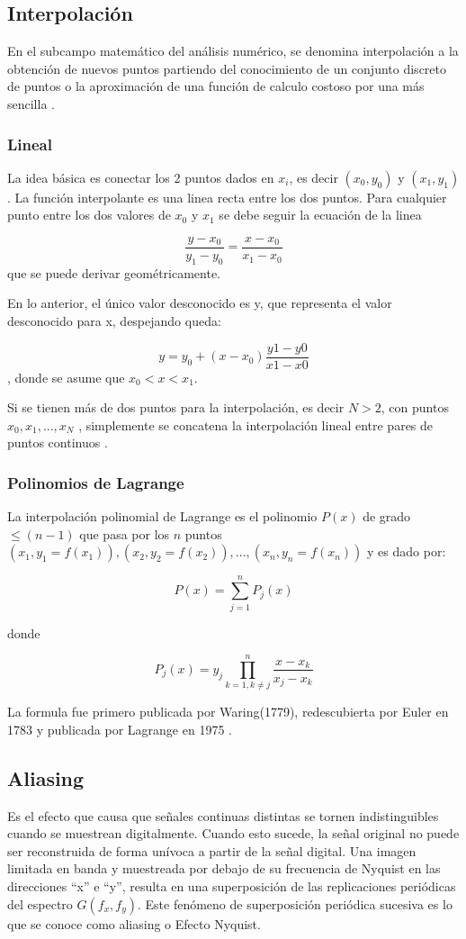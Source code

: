 \documentclass[comsoc, journal]{IEEEtran}
\begin{document}
\subsection{Interpolación}
En el subcampo matemático del análisis numérico, se denomina interpolación a la obtención de nuevos puntos partiendo del conocimiento de un conjunto discreto de puntos o la aproximación de una función de calculo costoso por una más sencilla \cite{crochiere}.

\subsubsection{Lineal}

La idea básica es conectar los 2 puntos dados en $x_i$, es decir $(x_0, y_0)$ y $(x_1, y_1)$. La función interpolante es una linea recta entre los dos puntos. Para cualquier punto entre los dos valores de $x_0$ y $x_1$ se debe seguir la ecuación de la linea

$$\frac{y - x_0}{y_1 - y_0} = \frac{x - x_0}{x_1 - x_0}$$
que se puede derivar geométricamente.

En lo anterior, el único valor desconocido es y, que representa el valor desconocido para x, despejando queda:

$$y = y_0 + (x - x_0) \frac{y1 - y0}{x1 - x0}$$
, 
donde se asume que $x_0 < x < x_1$.

Si se tienen más de dos puntos para la interpolación, es decir $N > 2$, con
puntos $x_0, x_1,..., x_N$ , simplemente se concatena la interpolación lineal entre pares de puntos continuos \cite{interp}.

\subsubsection{Polinomios de Lagrange}

La interpolación polinomial de Lagrange es el polinomio $P(x)$ de grado $\leq (n-1)$ que pasa por los $n$ puntos $(x_1, y_1 = f(x_1)), (x_2, y_2 = f(x_2)), ... , (x_n, y_n = f(x_n))$ y es dado por:

$$P(x) =\sum_{j=1}^{n} P_j(x)$$

donde

$$P_j(x) = y_j \prod_{k=1 , k \neq j}^{n} \frac{x-x_k}{x_j - x_k}$$

La formula fue primero publicada por Waring(1779), redescubierta por Euler en 1783 y publicada por Lagrange en 1975 \cite{lagr}.


\subsection{Aliasing}
Es el efecto que causa que señales continuas distintas se tornen indistinguibles cuando se muestrean digitalmente. Cuando esto sucede, la señal original no puede ser reconstruida de forma unívoca a partir de la señal digital. Una imagen limitada en banda y muestreada por debajo de su frecuencia de Nyquist en las direcciones ``x'' e ``y'', resulta en una superposición de las replicaciones periódicas del espectro $G(f_x, f_y)$. Este fenómeno de superposición periódica sucesiva es lo que se conoce como aliasing o Efecto Nyquist.
\end{document}
